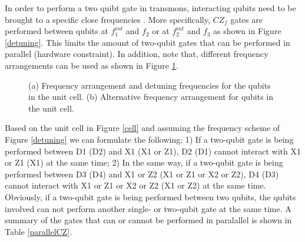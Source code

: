 \documentclass[11pt]{article}
\begin{document}
In order to perform a two quibt gate in transmons, interacting qubits need to be brought to a specific close frequencies \cite{versluis2016scalable}. More specifically, $CZ_f$ gates are performed between qubits at $f^{int}_1$ and $f_2$ or at $f^{int}_2$ and $f_3$ as shown in Figure \ref{detuning}. This limits the amount of two-qubit gates that can be performed in parallel (hardware constraint). In addition, note that, different frequency arrangements can be used as shown in Figure \ref{sequence}. 


\begin{figure}[h!]
\centerline{
}
\caption{(a) Frequency arrangement and detuning frequencies for the qubits in the unit cell. (b) Alternative frequency arrangement for qubits in the unit cell.}
\label{sequence}
\end{figure}


Based on the unit cell in Figure \ref{cell} and assuming the frequency scheme of Figure \ref{detuning} we can formulate the following: 1) If a two-qubit gate is being performed between D1 (D2) and X1 (X1 or Z1), D2 (D1) cannot interact with X1 or Z1 (X1) at the same time; 2) In the same way, if a two-qubit gate is being performed between D3 (D4) and X1 or Z2 (X1 or Z1 or X2 or Z2), D4 (D3) cannot interact with X1 or Z1 or X2 or Z2 (X1 or Z2) at the same time. Obviously,  if a two-qubit gate is being performed between two qubits, the qubits involved can not perform another single- or two-qubit gate at the same time. A summary of the gates that can or cannot be performed in paralallel is shown in Table \ref{parallelCZ}.
\end{document}
